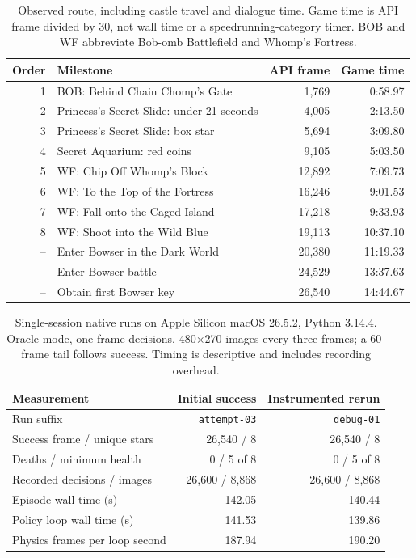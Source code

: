 \documentclass[10pt,letterpaper]{article}
\newcommand{\code}[1]{\texttt{#1}}
\begin{document}
\begin{table}[h]\centering\small
\begin{tabularx}{\linewidth}{@{}rYr r@{}}
\toprule
Order & Milestone & API frame & Game time \\
 & BOB: Behind Chain Chomp's Gate & 1,769 & 0:58.97 \\
2 & Princess's Secret Slide: under 21 seconds & 4,005 & 2:13.50 \\
3 & Princess's Secret Slide: box star & 5,694 & 3:09.80 \\
4 & Secret Aquarium: red coins & 9,105 & 5:03.50 \\
5 & WF: Chip Off Whomp's Block & 12,892 & 7:09.73 \\
6 & WF: To the Top of the Fortress & 16,246 & 9:01.53 \\
7 & WF: Fall onto the Caged Island & 17,218 & 9:33.93 \\
8 & WF: Shoot into the Wild Blue & 19,113 & 10:37.10 \\
-- & Enter Bowser in the Dark World & 20,380 & 11:19.33 \\
-- & Enter Bowser battle & 24,529 & 13:37.63 \\
-- & Obtain first Bowser key & 26,540 & 14:44.67 \\
\bottomrule
\end{tabularx}
\caption{Observed route, including castle travel and dialogue time. Game time is API frame divided by 30, not wall time or a speedrunning-category timer. BOB and WF abbreviate Bob-omb Battlefield and Whomp's Fortress.}
\end{table}

\begin{table}[h]\centering\small
\begin{tabularx}{\linewidth}{@{}Yrr@{}}
\toprule
Measurement & Initial success & Instrumented rerun \\
\midrule
Run suffix & \code{attempt-03} & \code{debug-01} \\
Success frame / unique stars & 26,540 / 8 & 26,540 / 8 \\
Deaths / minimum health & 0 / 5 of 8 & 0 / 5 of 8 \\
Recorded decisions / images & 26,600 / 8,868 & 26,600 / 8,868 \\
Episode wall time (s) & 142.05 & 140.44 \\
Policy loop wall time (s) & 141.53 & 139.86 \\
Physics frames per loop second & 187.94 & 190.20 \\
\bottomrule
\end{tabularx}
\caption{Single-session native runs on Apple Silicon macOS 26.5.2, Python 3.14.4. Oracle mode, one-frame decisions, 480$\times$270 images every three frames; a 60-frame tail follows success. Timing is descriptive and includes recording overhead.}
\end{table}
\end{document}
